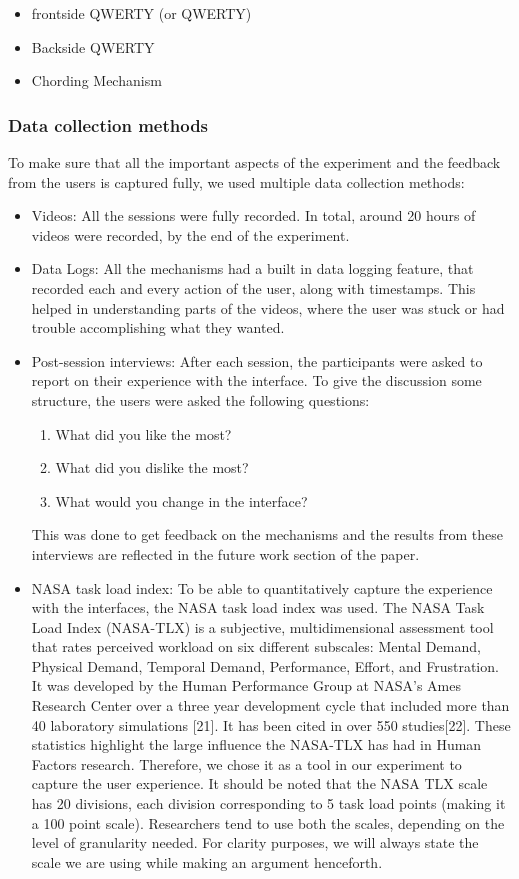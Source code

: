 \begin{itemize}
	\item frontside QWERTY (or QWERTY)
	\item Backside QWERTY
	\item Chording Mechanism
\end{itemize}
\subsubsection{Data collection methods}

To make sure that all the important aspects of the experiment and the
feedback from the users is captured fully, we used multiple data
collection methods:

\begin{itemize}
\item Videos: All the sessions were fully recorded. In total, around
  20 hours of videos were recorded, by the end of the experiment.
\item Data Logs: All the mechanisms had a built in data logging
  feature, that recorded each and every action of the user, along with
  timestamps. This helped in understanding parts of the videos, where
  the user was stuck or had trouble accomplishing what they wanted.
\item Post-session interviews: After each session, the participants
  were asked to report on their experience with the interface. To give
  the discussion some structure, the users were asked the following
  questions:

\begin{enumerate}
	\item What did you like the most?
	\item What did you dislike the most?
	\item What would you change in the interface?
\end{enumerate}

This was done to get feedback on the mechanisms and the results from these interviews are reflected in the future work section of the paper. 

\item NASA task load index: To be able to quantitatively capture the
  experience with the interfaces, the NASA task load index was
  used. The NASA Task Load Index (NASA-TLX) is a subjective,
  multidimensional assessment tool that rates perceived workload on
  six different subscales: Mental Demand, Physical Demand, Temporal
  Demand, Performance, Effort, and Frustration. It was developed by
  the Human Performance Group at NASA's Ames Research Center over a
  three year development cycle that included more than 40 laboratory
  simulations [21]. It has been cited in over 550
  studies[22]. These statistics highlight the
  large influence the NASA-TLX has had in Human Factors
  research. Therefore, we chose it as a tool in our experiment to
  capture the user experience. It should be noted that the NASA TLX scale has 20 divisions, each division corresponding to 5 task load points (making it a 100 point scale). Researchers tend to use both the scales, depending on the level of granularity needed. For clarity purposes, we will always state the scale we are using while making an argument henceforth. 


\end{itemize}
